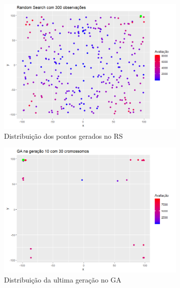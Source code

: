 \begin{figure}[ht]
	\centering
	\begin{subfigure}[b]{0.47\linewidth}
		\includegraphics[width=\linewidth]{imagens/scatter_rs_P30_T10.png}
		\caption{Distribuição dos pontos gerados no RS}
	\end{subfigure}
	\begin{subfigure}[b]{0.47\linewidth}
		\includegraphics[width=\linewidth]{imagens/scatter_GA_P30_T10.png}
		\caption{Distribuição da ultima geração no GA}
	\end{subfigure}
	\begin{subfigure}[b]{0.65\linewidth}

\end{subfigure}
\end{figure}
